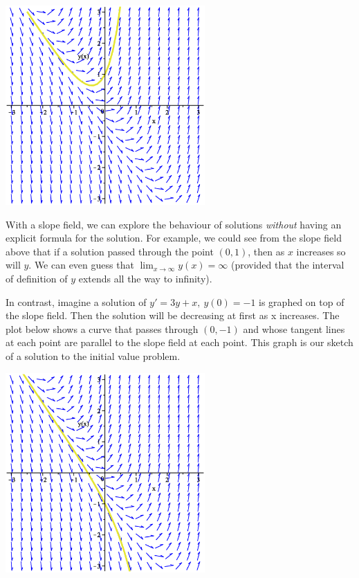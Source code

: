 \documentclass[12pt,letterpaper,twoside]{amsart}
\newcounter{example}
\newcounter{problem}
\begin{document}
\begin{center}
\includegraphics[width=3in]{slopefield2.eps} 
\end{center}

With a slope field, we can explore the behaviour of solutions {\it without} having an explicit formula for the solution.  For example, we could see from the slope field above that if a solution passed through the point $(0,1)$, then as $x$ increases so will $y$.  We can even guess that $\lim_{x \rightarrow \infty} y(x)=\infty$ (provided that the interval of definition of $y$ extends all the way to infinity).

In contrast, imagine a solution of $y'=3y+x, \ y(0)=-1$ is graphed on top of the slope field.  Then the solution will be decreasing at first as x increases. The plot below shows a curve that passes through $(0,-1)$ and whose tangent lines at each point are parallel to the slope field at each point.  This graph is our sketch of a solution to the initial value problem.

\begin{center}
\includegraphics[width=3in]{slopefield3.eps}
\end{center}
\end{document}
